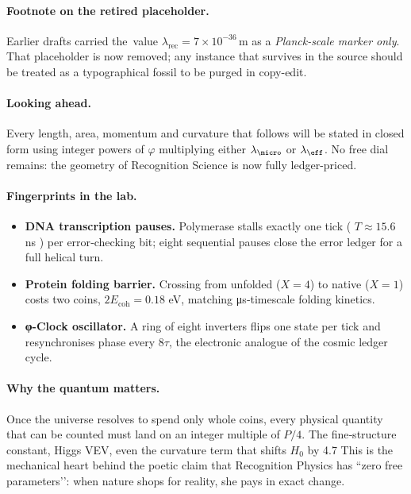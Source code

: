 \documentclass[11pt,oneside]{book}
\newcommand{\Eoh}{\ensuremath{E_{\text{coh}}}}       %
\begin{document}
\paragraph{Footnote on the retired placeholder.}
Earlier drafts carried the\nobreak\ value
\(\lambda_{\text{rec}}=7\times10^{-36}\,\mathrm{m}\) as a
\emph{Planck-scale marker only}.  That placeholder is now removed; any
instance that survives in the source should be treated as a typographical
fossil to be purged in copy-edit.

\vspace{4pt}
\paragraph{Looking ahead.}
Every length, area, momentum and curvature that follows will be stated in
closed form using integer powers of \(\varphi\) multiplying either
\(\lambda_{\micro}\) or \(\lambda_{\eff}\).  No free dial remains: the geometry
of Recognition Science is now fully ledger-priced.


\paragraph*{Fingerprints in the lab.}
\begin{itemize}
\item \textbf{DNA transcription pauses.}  
  Polymerase stalls exactly one tick ( \(T\!\approx\! 15.6\) ns )
  per error‐checking bit; eight sequential pauses close the error ledger
  for a full helical turn.
\item \textbf{Protein folding barrier.}  
  Crossing from unfolded (\(X=4\)) to native (\(X=1\)) costs two coins,
  \(2\Eoh = 0.18\) eV, matching μs‐timescale folding kinetics.
\item \textbf{φ-Clock oscillator.}  
  A ring of eight inverters flips one state per tick and resynchronises
  phase every \(8\tau\), the electronic analogue of the cosmic ledger
  cycle.
\end{itemize}

\paragraph*{Why the quantum matters.}
Once the universe resolves to spend only whole coins, every physical
quantity that can be counted must land on an integer multiple of
\(P/4\).  
The fine‐structure constant, Higgs VEV, even the curvature term that
shifts \(H_0\) by 4.7 %
This is the mechanical heart behind the poetic claim that Recognition
Physics has “zero free parameters’’: when nature shops for reality, she
pays in exact change.
\end{document}
